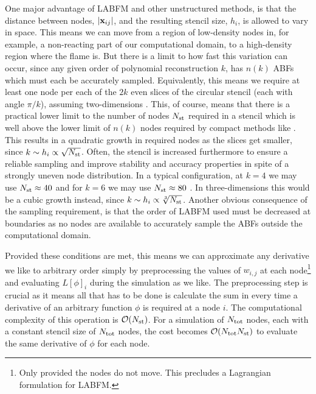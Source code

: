 One major advantage of LABFM and other unstructured methods, is that the distance between nodes, $\abs{\vec{x}_{ij}}$, and the resulting stencil size, $h_i$, is allowed to vary in space. This means we can move from a region of low-density nodes in, for example, a non-reacting part of our computational domain, to a high-density region where the flame is. But there is a limit to how fast this variation can occur, since any given order of polynomial reconstruction $k$, has $n(k)$ ABFs which must each be accurately sampled. Equivalently, this means we require at least one node per each of the $2k$ even slices of the circular stencil (each with angle $\pi / k$), assuming two-dimensions \cite{king2020HighOrderDifference}. This, of course, means that there is a practical lower limit to the number of nodes $N_{\rm{st}}$ required in a stencil which is well above the lower limit of $n(k)$ nodes required by compact methods like \cite{jensen1972FiniteDifferenceTechniques}. This results in a quadratic growth in required nodes as the slices get smaller, since $k \sim h_i \propto \sqrt{N_{\rm{st}}}$. Often, the stencil is increased furthermore to ensure a reliable sampling and improve stability and accuracy properties in spite of a strongly uneven node distribution. In a typical configuration, at $k = 4$ we may use $N_{\rm{st}} \approx 40$ and for $k = 6$ we may use $N_{\rm{st}} \approx 80$ . In three-dimensions this would be a cubic growth instead, since $k \sim h_i \propto \sqrt[3]{N_{\rm{st}}}$. Another obvious consequence of the sampling requirement, is that the order of LABFM used must be decreased at boundaries as no nodes are available to accurately sample the ABFs outside the computational domain.

Provided these conditions are met, this means we can approximate any derivative we like to arbitrary order simply by preprocessing the values of $w_{i, j}$ at each node\footnote{Only provided the nodes do not move. This precludes a Lagrangian formulation for LABFM.} and evaluating $L[\phi]_i$ during the simulation as we like. The preprocessing step is crucial as it means all that has to be done is calculate the sum in  every time a derivative of an arbitrary function $\phi$ is required at a node $i$. The computational complexity of this operation is $\cl{O}(N_{\rm{st}})$. For a simulation of $N_{\rm{tot}}$ nodes, each with a constant stencil size of $N_{\rm{tot}}$ nodes, the cost becomes $\cl{O}(N_{\rm{tot}} N_{\rm{st}})$ to evaluate the same derivative of $\phi$ for each node.



